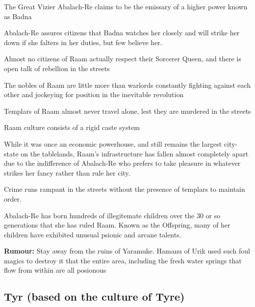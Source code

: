 \begin{multicols}{2}
\begin{description}
    \item The Great Vizier Abalach-Re claims to be the emissary of a higher power known as Badna
    \item Abalach-Re assures citizens that Badna watches her closely and will strike her down if she falters in her duties, but few believe her.
    \item Almost no citizens of Raam actually respect their Sorcerer Queen, and there is open talk of rebellion in the streets
    \item The nobles of Raam are little more than warlords constantly fighting against each other and jockeying for position in the inevitable revolution
    \item Templars of Raam almost never travel alone, lest they are murdered in the streets
    \item Raam culture consists of a rigid caste system
    \item While it was once an economic powerhouse, and still remains the largest city-state on the tablelands, Raam’s infrastructure has fallen almost completely apart due to the indifference of Abalach-Re who prefers to take pleasure in whatever strikes her fancy rather than rule her city.
    \item Crime runs rampant in the streets without the presence of templars to maintain order.
    \item Abalach-Re has born hundreds of illegitemate children over the 30 or so generations that she has ruled Raam. Known as the Offspring, many of her children have exhibited unusual psionic and arcane talents.
    \item \textbf{Rumour:} Stay away from the ruins of Yaramuke. Hamanu of Urik used such foul magics to destroy it that the entire area, including the fresh water springs that flow from within are all posionous
\end{description}

\subsection{Tyr (based on the culture of Tyre)}


\end{multicols}
